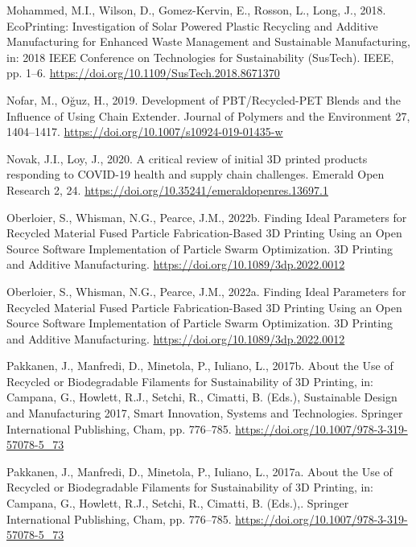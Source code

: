 \documentclass[
  12pt,
  number,
  review]{elsarticle}
\newlength{\cslhangindent}
\newlength{\cslentryspacingunit} %
\newenvironment{CSLReferences}[2] %
 {%
  \setlength{\parindent}{0pt}
  \ifodd #1
  \let\oldpar\par
  \def\par{\hangindent=\cslhangindent\oldpar}
  \fi
  \setlength{\parskip}{#2\cslentryspacingunit}
 }%
 {}
\begin{document}
\begin{CSLReferences}{1}{0}
\leavevmode{}%
Mohammed, M.I., Wilson, D., Gomez-Kervin, E., Rosson, L., Long, J.,
2018. {EcoPrinting}: {Investigation} of {Solar Powered Plastic
Recycling} and {Additive Manufacturing} for {Enhanced Waste Management}
and {Sustainable Manufacturing}, in: 2018 {IEEE Conference} on
{Technologies} for {Sustainability} ({SusTech}). {IEEE}, pp. 1--6.
\url{https://doi.org/10.1109/SusTech.2018.8671370}

\leavevmode{}%
Nofar, M., Oğuz, H., 2019. Development of {PBT}/{Recycled-PET Blends}
and the {Influence} of {Using Chain Extender}. Journal of Polymers and
the Environment 27, 1404--1417.
\url{https://doi.org/10.1007/s10924-019-01435-w}

\leavevmode{}%
Novak, J.I., Loy, J., 2020. A critical review of initial {3D} printed
products responding to {COVID-19} health and supply chain challenges.
Emerald Open Research 2, 24.
\url{https://doi.org/10.35241/emeraldopenres.13697.1}

\leavevmode{}%
Oberloier, S., Whisman, N.G., Pearce, J.M., 2022b. Finding {Ideal
Parameters} for {Recycled Material Fused Particle Fabrication-Based 3D
Printing Using} an {Open Source Software Implementation} of {Particle
Swarm Optimization}. 3D Printing and Additive Manufacturing.
\url{https://doi.org/10.1089/3dp.2022.0012}

\leavevmode{}%
Oberloier, S., Whisman, N.G., Pearce, J.M., 2022a. Finding {Ideal
Parameters} for {Recycled Material Fused Particle Fabrication-Based 3D
Printing Using} an {Open Source Software Implementation} of {Particle
Swarm Optimization}. 3D Printing and Additive Manufacturing.
\url{https://doi.org/10.1089/3dp.2022.0012}

\leavevmode{}%
Pakkanen, J., Manfredi, D., Minetola, P., Iuliano, L., 2017b. About the
{Use} of {Recycled} or {Biodegradable Filaments} for {Sustainability} of
{3D Printing}, in: Campana, G., Howlett, R.J., Setchi, R., Cimatti, B.
(Eds.), Sustainable {Design} and {Manufacturing} 2017, Smart
{Innovation}, {Systems} and {Technologies}. {Springer International
Publishing}, {Cham}, pp. 776--785.
\url{https://doi.org/10.1007/978-3-319-57078-5_73}

\leavevmode{}%
Pakkanen, J., Manfredi, D., Minetola, P., Iuliano, L., 2017a. About the
{Use} of {Recycled} or {Biodegradable Filaments} for {Sustainability} of
{3D Printing}, in: Campana, G., Howlett, R.J., Setchi, R., Cimatti, B.
(Eds.),. {Springer International Publishing}, {Cham}, pp. 776--785.
\url{https://doi.org/10.1007/978-3-319-57078-5_73}


\end{CSLReferences}
\end{document}
